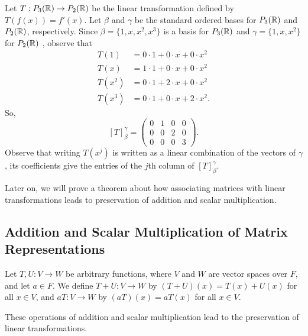 \begin{eg}\label{Example 4 of Section 2.2}
    Let \( T: {P}_{3}(\mathbb{R}) \to {P}_{2}(\mathbb{R}) \) be the linear transformation defined by \( T(f(x)) = f'(x) \). Let \( \beta \) and \( \gamma  \) be the standard ordered bases for \( {P}_{3}(\mathbb{R}) \) and \( {P}_{2}(\mathbb{R}) \), respectively. Since \( \beta = \{ 1, x , x^{2}, x^{3} \}  \) is a basis for \( {P}_{3}(\mathbb{R}) \) and \( \gamma = \{ 1,x,x^{2} \}  \) for \( {P}_{2}(\mathbb{R}) \) , observe that
    \begin{align*}
        T(1) &= 0 \cdot 1 + 0 \cdot x + 0 \cdot x^{2} \\
        T(x) &= 1 \cdot 1 + 0 \cdot x + 0 \cdot x^{2} \\
        T(x^{2}) &= 0 \cdot 1 + 2 \cdot x + 0 \cdot x^{2} \\
        T(x^{3}) &= 0 \cdot 1 + 0 \cdot x + 2 \cdot x^{2}.
    \end{align*}
    So, 
    \[  [T]_{\beta}^{\gamma}  = \begin{pmatrix}
        0 & 1 & 0 & 0 \\
        0 & 0 & 2 & 0 \\
        0 & 0 & 0 & 3
    \end{pmatrix}. \]
    Observe that writing \( T(x^{j}) \) is written as a linear combination of the vectors of \( \gamma  \), its coefficients give the entries of the \( j \)th column of \( {[T]}_{\beta}^{\gamma} \).
\end{eg}

Later on, we will prove a theorem about how associating matrices with linear transformations leads to preservation of addition and scalar multiplication. 

\subsection{Addition and Scalar Multiplication of Matrix Representations}

\begin{definition}
   Let \( T, U: V \to W  \) be arbitrary functions, where \( V  \) and \( W  \) are vector spaces over \( F  \), and let \( a \in F  \). We define \( T + U : V \to W  \) by \( (T+U)(x) =  T(x) + U(x)   \) for all \( x \in V  \), and \( aT: V \to W  \) by \( (aT)(x) = aT(x) \) for all \( x \in V  \). 
\end{definition}

These operations of addition and scalar multiplication lead to the preservation of linear transformations.

